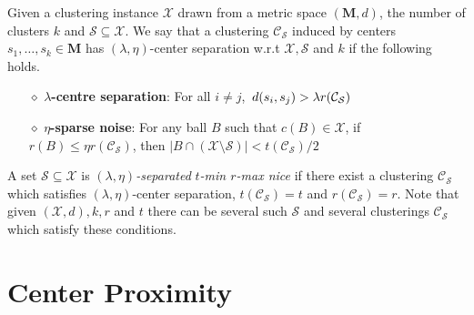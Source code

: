 \documentclass[anon,12pt]{colt2016} %
\newcommand{\mc}{\mathcal}
\newcommand{\mb}{\mathbf}
\begin{document}
\begin{definition}
Given a clustering instance $\mc X$ drawn from a metric space $(\mb M, d)$, the number of clusters $k$ and $\mc S \subseteq \mc X$. We say that a clustering $\mc C_{\mc S}$ induced by centers $s_1, \ldots, s_k \in \mb M$ has $(\lambda, \eta)$-center separation w.r.t $\mc X, \mc S$ and $k$ if the following holds.

\begin{itemize}[nolistsep, noitemsep]
\label{defn:lambdacsnoise}	

\item[$\diamond$] {\bf $\lambda$-centre separation}: For all $i\neq j$, $\thinspace d(s_i, s_j) > \lambda r({\mc C}_{\mc S})$
\item[$\diamond$]{\bf $\eta$-sparse noise}: For any ball $B$ such that $c(B)\in \mathcal{X}$, if $r(B)\leq \eta r(\mc{C}_{\mc{S}})$, then $|B\cap (\mc X\setminus \mc S)| < t({\mc C}_{\mc S})/2$
\end{itemize}
\end{definition}

\noindent A set $\mc S \subseteq \mc X$ is {\it $(\lambda, \eta)$-separated} {\it $t$-min $r$-max nice} if there exist a clustering $\mc C_{\mc S}$ which satisfies $(\lambda, \eta)$-center separation,  $t({\mc C}_{\mc S}) = t$ and $r({\mc C}_{\mc S}) = r$. Note that given $(\mc X, d), k, r$ and $t$ there can be several such $\mc S$ and several clusterings $\mc C_{\mc S}$ which satisfy these conditions.

\section{Center Proximity}
\label{section:cp}
\end{document}
